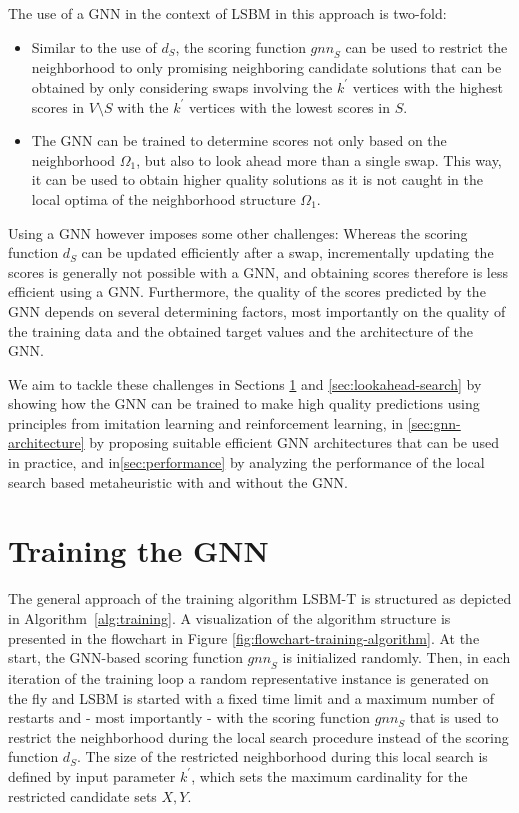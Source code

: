 \documentclass[draft,final]{vutinfth} %
\begin{document}
The use of a GNN in the context of LSBM in this approach is two-fold: 
\begin{itemize}
    \item Similar to the use of $d_S$, the scoring function $\mathit{gnn}_S$ can be used to restrict the neighborhood to only promising neighboring candidate solutions that can be obtained by only considering swaps involving the $k^\prime$ vertices with the highest scores in $V \setminus S$ with the $k^\prime$ vertices with the lowest scores in $S$. 
    \item The GNN can be trained to determine scores not only based on the neighborhood $\Omega_1$, but also to look ahead more than a single swap. This way, it can be used to obtain higher quality solutions as it is not caught in the local optima of the neighborhood structure $\Omega_1$.
\end{itemize}

Using a GNN however imposes some other challenges: 
Whereas the scoring function $d_S$ can be updated efficiently after a swap, incrementally updating the scores is generally not possible with a GNN, and obtaining scores therefore is less efficient using a GNN. 
Furthermore, the quality of the scores predicted by the GNN depends on several determining factors, most importantly on the quality of the training data and the obtained target values and the architecture of the GNN. 

We aim to tackle these challenges in Sections \ref{sec:gnn-training} and \ref{sec:lookahead-search} by showing how the GNN can be trained to make high quality predictions using principles from imitation learning and reinforcement learning, in \ref{sec:gnn-architecture} by proposing suitable efficient GNN architectures that can be used in practice, and in\ref{sec:performance} by analyzing the performance of the local search based metaheuristic with and without the GNN. 

\section{Training the GNN}\label{sec:gnn-training}

The general approach of the training algorithm LSBM-T is structured as depicted in Algorithm~\ref{alg:training}. A visualization of the algorithm structure is presented in the flowchart in Figure \ref{fig:flowchart-training-algorithm}. 
At the start, the GNN-based scoring function $\mathit{gnn}_S$ is initialized randomly. Then, in each iteration of the training loop a random representative instance is generated on the fly and LSBM is started with a fixed time limit and a maximum number of restarts and - most importantly - with the scoring function $\mathit{gnn_S}$ that is used to restrict the neighborhood during the local search procedure instead of the scoring function $d_S$. The size of the restricted neighborhood during this local search is defined by input parameter $k^\prime$, which sets the maximum cardinality for the restricted candidate sets $X, Y$.
\end{document}
